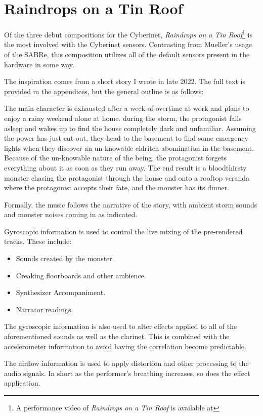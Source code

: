 \section{Raindrops on a Tin Roof}
Of the three debut compositions for the Cyberinet, \textit{Raindrops on a Tin Roof}\footnote{A performance video of \textit{Raindrops on a Tin Roof} is available at} is the most involved with the Cyberinet sensors. Contrasting from Mueller's usage of the SABRe, this composition utilizes all of the default sensors present in the hardware in some way. 

The inspiration comes from a short story I wrote in late 2022. The full text is provided in the appendices, but the general outline is as follows:

The main character is exhausted after a week of overtime at work and plans to enjoy a rainy weekend alone at home. during the storm, the protagonist falls asleep and wakes up to find the house completely dark and unfamiliar. Assuming the power has just cut out, they head to the basement to find some emergency lights when they discover an un-knowable eldritch abomination in the basement. Because of the un-knowable nature of the being, the protagonist forgets everything about it as soon as they run away. The end result is a bloodthirsty monster chasing the protagonist through the house and onto a rooftop veranda where the protagonist accepts their fate, and the monster has its dinner.

Formally, the music follows the narrative of the story, with ambient storm sounds and monster noises coming in as indicated. 

Gyroscopic information is used to control the live mixing of the pre-rendered tracks. These include:
\begin{itemize}
    \item Sounds created by the monster.
    \item Creaking floorboards and other ambience.
    \item Synthesizer Accompaniment.
    \item Narrator readings.
\end{itemize}

The gyroscopic information is also used to alter effects applied to all of the aforementioned sounds as well as the clarinet. This is combined with the accelerometer information to avoid having the correlation become predictable.

The airflow information is used to apply distortion and other processing to the audio signals. In short as the performer's breathing increases, so does the effect application.

